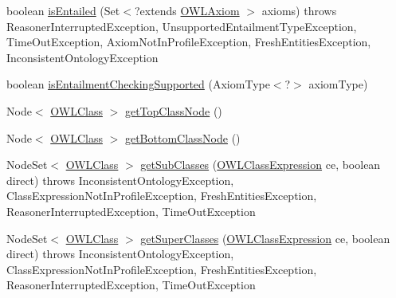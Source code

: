 \begin{DoxyCompactItemize}
\item 
boolean \hyperlink{classorg_1_1semanticweb_1_1owlapi_1_1reasoner_1_1structural_1_1_structural_reasoner_a0a5750c03d947cf9ba92cbbde2e213e7}{is\-Entailed} (Set$<$?extends \hyperlink{interfaceorg_1_1semanticweb_1_1owlapi_1_1model_1_1_o_w_l_axiom}{O\-W\-L\-Axiom} $>$ axioms)  throws Reasoner\-Interrupted\-Exception, Unsupported\-Entailment\-Type\-Exception, Time\-Out\-Exception, Axiom\-Not\-In\-Profile\-Exception, Fresh\-Entities\-Exception, Inconsistent\-Ontology\-Exception 
\item 
boolean \hyperlink{classorg_1_1semanticweb_1_1owlapi_1_1reasoner_1_1structural_1_1_structural_reasoner_a275ef13de2d55b0123ff94bce52ea78b}{is\-Entailment\-Checking\-Supported} (Axiom\-Type$<$?$>$ axiom\-Type)
\item 
Node$<$ \hyperlink{interfaceorg_1_1semanticweb_1_1owlapi_1_1model_1_1_o_w_l_class}{O\-W\-L\-Class} $>$ \hyperlink{classorg_1_1semanticweb_1_1owlapi_1_1reasoner_1_1structural_1_1_structural_reasoner_a5a82ec82dafde4284a34e30300f3f199}{get\-Top\-Class\-Node} ()
\item 
Node$<$ \hyperlink{interfaceorg_1_1semanticweb_1_1owlapi_1_1model_1_1_o_w_l_class}{O\-W\-L\-Class} $>$ \hyperlink{classorg_1_1semanticweb_1_1owlapi_1_1reasoner_1_1structural_1_1_structural_reasoner_a4cbd36e5a11678e0eb34c3c21a08682a}{get\-Bottom\-Class\-Node} ()
\item 
Node\-Set$<$ \hyperlink{interfaceorg_1_1semanticweb_1_1owlapi_1_1model_1_1_o_w_l_class}{O\-W\-L\-Class} $>$ \hyperlink{classorg_1_1semanticweb_1_1owlapi_1_1reasoner_1_1structural_1_1_structural_reasoner_a230ccc3777750b198e19af80dbb2ab97}{get\-Sub\-Classes} (\hyperlink{interfaceorg_1_1semanticweb_1_1owlapi_1_1model_1_1_o_w_l_class_expression}{O\-W\-L\-Class\-Expression} ce, boolean direct)  throws Inconsistent\-Ontology\-Exception, Class\-Expression\-Not\-In\-Profile\-Exception, Fresh\-Entities\-Exception, Reasoner\-Interrupted\-Exception, Time\-Out\-Exception 
\item 
Node\-Set$<$ \hyperlink{interfaceorg_1_1semanticweb_1_1owlapi_1_1model_1_1_o_w_l_class}{O\-W\-L\-Class} $>$ \hyperlink{classorg_1_1semanticweb_1_1owlapi_1_1reasoner_1_1structural_1_1_structural_reasoner_a2738b25ae286b0da929053291a7a82c6}{get\-Super\-Classes} (\hyperlink{interfaceorg_1_1semanticweb_1_1owlapi_1_1model_1_1_o_w_l_class_expression}{O\-W\-L\-Class\-Expression} ce, boolean direct)  throws Inconsistent\-Ontology\-Exception, Class\-Expression\-Not\-In\-Profile\-Exception, Fresh\-Entities\-Exception, Reasoner\-Interrupted\-Exception, Time\-Out\-Exception 

\end{DoxyCompactItemize}
